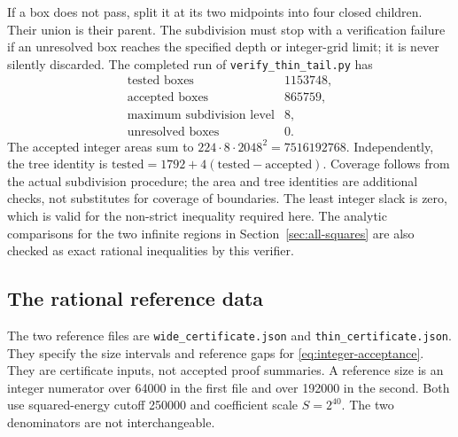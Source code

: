 \documentclass[11pt,reqno]{amsart}
\numberwithin{equation}{section}
\begin{document}
If a box does not pass, split it at its two midpoints
into four closed children. Their union is their parent.
The subdivision must stop with a verification failure
if an unresolved box reaches the specified depth or
integer-grid limit; it is never silently discarded.
The completed run of \texttt{verify\_thin\_tail.py} has
\[
 \begin{array}{lr}
 \text{tested boxes}&1153748,\\
 \text{accepted boxes}&865759,\\
 \text{maximum subdivision level}&8,\\
 \text{unresolved boxes}&0.
 \end{array}
\]
The accepted integer areas sum to
$224\cdot8\cdot2048^2=7516192768$. Independently, the
tree identity is
$\text{tested}=1792+4(\text{tested}-\text{accepted})$.
Coverage follows from the actual subdivision procedure;
the area and tree identities are additional checks, not
substitutes for coverage of boundaries. The least
integer slack is zero, which is valid for the non-strict
inequality required here. The analytic comparisons for
the two infinite regions in
Section~\ref{sec:all-squares} are also checked as exact
rational inequalities by this verifier.

\subsection*{The rational reference data}

The two reference files are
\texttt{wide\_certificate.json} and
\texttt{thin\_certificate.json}. They specify the size
intervals and reference gaps for
\eqref{eq:integer-acceptance}. They are certificate
inputs, not accepted proof summaries. A reference size
is an integer numerator over 64000 in the first file
and over 192000 in the second. Both use squared-energy
cutoff 250000 and coefficient scale $S=2^{40}$.
The two denominators are not interchangeable.
\end{document}
